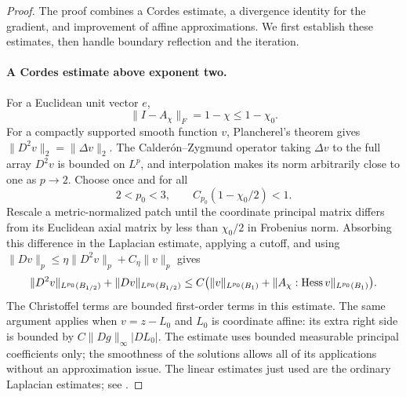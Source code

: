 \begin{proof}
The proof combines a Cordes estimate, a divergence identity for the
gradient, and improvement of affine approximations. We first establish
these estimates, then handle boundary reflection and the iteration.

\paragraph{A Cordes estimate above exponent two.}
For a Euclidean unit vector $e$,
\begin{equation}\label{n3:existence:cordes-defect}
 \|I-A_\chi\|_F=1-\chi\le1-\chi_0.
\end{equation}
For a compactly supported smooth function $v$, Plancherel's theorem
gives $\|D^2v\|_2=\|\Delta v\|_2$.  The Calder\'on--Zygmund
operator taking $\Delta v$ to the full array $D^2v$ is bounded on
$L^p$, and interpolation makes its norm arbitrarily close to one as
$p\to2$.  Choose once and for all
\begin{equation}\label{n3:existence:p-zero}
 2<p_0<3,\qquad
 C_{p_0}(1-\chi_0/2)<1.
\end{equation}
Rescale a metric-normalized patch until the coordinate principal
matrix differs from its Euclidean axial matrix by less than
$\chi_0/2$ in Frobenius norm.  Absorbing this difference in the
Laplacian estimate, applying a cutoff, and using
$\|Dv\|_p\le\eta\|D^2v\|_p+C_\eta\|v\|_p$ gives
\begin{equation}\label{n3:existence:local-cordes}
 \|D^2v\|_{L^{p_0}(B_{1/2})}
 +\|Dv\|_{L^{p_0}(B_{1/2})}
 \le C\bigl(\|v\|_{L^{p_0}(B_1)}
       +\|A_\chi:\operatorname{Hess} v\|_{L^{p_0}(B_1)}\bigr).
\end{equation}
The Christoffel terms are bounded first-order terms in this estimate.
The same argument applies when $v=z-L_0$ and $L_0$ is coordinate
affine: its extra right side is bounded by
$C\|Dg\|_\infty|DL_0|$.
The estimate uses bounded measurable principal coefficients only;
the smoothness of the solutions allows all of its applications
without an approximation issue.  The linear estimates just used are
the ordinary Laplacian estimates; see
\cite[Chapters 7 and 9]{GilbargTrudinger2001}.


\end{proof}
